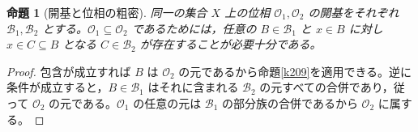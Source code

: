 \documentclass[a5paper,10pt,dvipdfmx]{jsarticle}
\theoremstyle{definition}
\theoremstyle{plain}
\newtheorem{prop}[ruledef]{命題}
\begin{document}
\begin{prop}[開基と位相の粗密]\label{k211}
同一の集合 $X$ 上の位相 $\mathcal O_1,\mathcal O_2$ の開基をそれぞれ $\mathcal B_1,\mathcal B_2$ とする。$\mathcal O_1\subseteq\mathcal O_2$ であるためには，任意の $B\in\mathcal B_1$ と $x\in B$ に対し $x\in C\subseteq B$ となる $C\in\mathcal B_2$ が存在することが必要十分である。
\end{prop}
\begin{proof}
包含が成立すれば $B$ は $\mathcal O_2$ の元であるから命題\ref{k209}を適用できる。逆に条件が成立すると，$B\in\mathcal B_1$ はそれに含まれる $\mathcal B_2$ の元すべての合併であり，従って $\mathcal O_2$ の元である。$\mathcal O_1$ の任意の元は $\mathcal B_1$ の部分族の合併であるから $\mathcal O_2$ に属する。
\end{proof}
\end{document}
